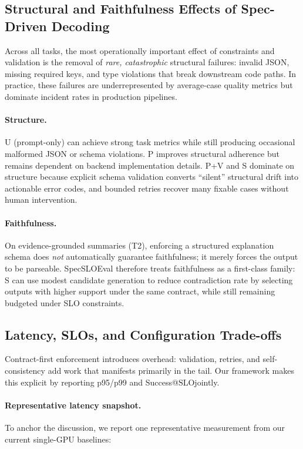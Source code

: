 \documentclass[11pt]{article}
\newcommand{\slo}{\ensuremath{\mathrm{SLO}}}
\begin{document}
\subsection{Structural and Faithfulness Effects of Spec-Driven Decoding}
\label{sec:results-structure-faith}

Across all tasks, the most operationally important effect of constraints and validation is the removal of \emph{rare, catastrophic} structural failures:
invalid JSON, missing required keys, and type violations that break downstream code paths.
In practice, these failures are underrepresented by average-case quality metrics but dominate incident rates in production pipelines.

\paragraph{Structure.}
U (prompt-only) can achieve strong task metrics while still producing occasional malformed JSON or schema violations.
P improves structural adherence but remains dependent on backend implementation details.
P+V and S dominate on structure because explicit schema validation converts “silent” structural drift into actionable error codes, and bounded retries recover many fixable cases without human intervention.

\paragraph{Faithfulness.}
On evidence-grounded summaries (T2), enforcing a structured explanation schema does \emph{not} automatically guarantee faithfulness; it merely forces the output to be parseable.
SpecSLOEval therefore treats faithfulness as a first-class family: S can use modest candidate generation to reduce contradiction rate by selecting outputs with higher support under the same contract, while still remaining budgeted under SLO constraints.

\subsection{Latency, SLOs, and Configuration Trade-offs}
\label{sec:results-slo}

Contract-first enforcement introduces overhead: validation, retries, and self-consistency add work that manifests primarily in the tail.
Our framework makes this explicit by reporting p95/p99 and Success@\slo jointly.

\paragraph{Representative latency snapshot.}
To anchor the discussion, we report one representative measurement from our current single-GPU baselines:
\end{document}
